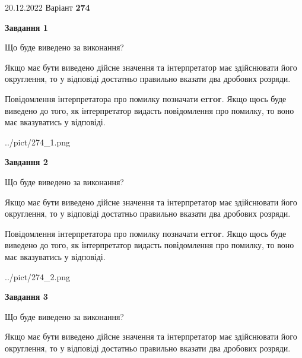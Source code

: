 \documentclass[12pt, ukrainian]{article}
\begin{document}
{20.12.2022 Варіант \No \textbf { 274 }\par}
{
\begin {Large}

{\begin {center}\textbf{Завдання 1}\end {center}}\par
Що буде виведено за виконання? \par

Якщо має бути виведено дійсне значення та інтерпретатор має здійснювати його округлення, 
то у відповіді достатньо правильно вказати два дробових розряди.

Повідомлення інтерпретатора про помилку позначати \textbf{error}.
Якщо щось буде виведено до того, як інтерпретатор видасть повідомлення про помилку, 
то воно має вказуватись у відповіді. \par

\begin{center}
	{../pict/274_1.png}
\end{center}
\newpage

{\begin {center}\textbf{Завдання 2}\end {center}}\par
Що буде виведено за виконання? \par

Якщо має бути виведено дійсне значення та інтерпретатор має здійснювати його округлення, 
то у відповіді достатньо правильно вказати два дробових розряди.

Повідомлення інтерпретатора про помилку позначати \textbf{error}.
Якщо щось буде виведено до того, як інтерпретатор видасть повідомлення про помилку, 
то воно має вказуватись у відповіді. \par

\begin{center}
	{../pict/274_2.png}
\end{center}
\newpage

{\begin {center}\textbf{Завдання 3}\end {center}}\par
Що буде виведено за виконання? \par

Якщо має бути виведено дійсне значення та інтерпретатор має здійснювати його округлення, 
то у відповіді достатньо правильно вказати два дробових розряди.


\end{Large}}
\end{document}
